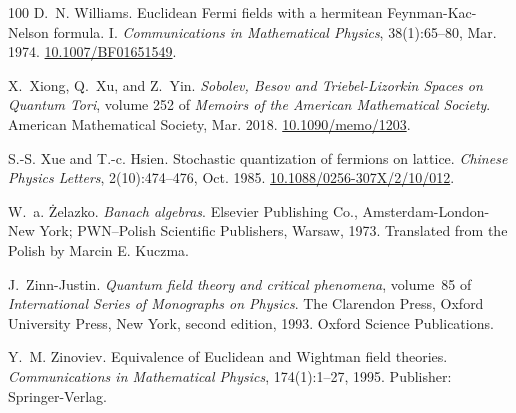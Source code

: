 \documentclass[11pt]{article}
\newcommand{\tmtextit}[1]{{\itshape{#1}}}
\begin{document}
\begin{thebibliography}{100}
  D.~N. Williams. {\newblock}Euclidean
  Fermi fields with a hermitean Feynman-Kac-Nelson formula. I.
  {\newblock}\tmtextit{Communications in Mathematical Physics}, 38(1):65--80,
  Mar. 1974.
  {\newblock}\href{https://doi.org/10.1007/BF01651549}{10.1007/BF01651549}.
  
  X.~Xiong, Q.~Xu, and Z.~Yin.
  {\newblock}\tmtextit{Sobolev, Besov and Triebel-Lizorkin Spaces on Quantum
  Tori}, volume 252 of \tmtextit{Memoirs of the American Mathematical
  Society}. {\newblock}American Mathematical Society, Mar. 2018.
  {\newblock}\href{https://doi.org/10.1090/memo/1203}{10.1090/memo/1203}.
  
  S.-S. Xue and T.-c. Hsien.
  {\newblock}Stochastic quantization of fermions on lattice.
  {\newblock}\tmtextit{Chinese Physics Letters}, 2(10):474--476, Oct. 1985.
  {\newblock}
  \href{https://doi.org/10.1088/0256-307X/2/10/012}{10.1088/0256-307X/2/10/012}.
  
  W.~a. {\.Z}elazko. {\newblock}\tmtextit{Banach
  algebras}. {\newblock}Elsevier Publishing Co., Amsterdam-London-New York;
  PWN--Polish Scientific Publishers, Warsaw, 1973. {\newblock}Translated from
  the Polish by Marcin E. Kuczma.
  
  J.~Zinn-Justin. {\newblock}\tmtextit{Quantum field
  theory and critical phenomena}, volume~85 of \tmtextit{International Series
  of Monographs on Physics}. {\newblock}The Clarendon Press, Oxford University
  Press, New York, second edition, 1993. {\newblock}Oxford Science
  Publications.
  
  Y.~M. Zinoviev.
  {\newblock}Equivalence of Euclidean and Wightman field theories.
  {\newblock}\tmtextit{Communications in Mathematical Physics}, 174(1):1--27,
  1995. {\newblock}Publisher: Springer-Verlag.
\end{thebibliography}
\end{document}
